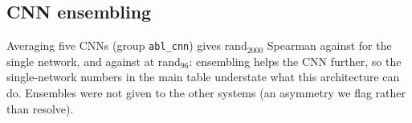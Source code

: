 \subsection{CNN ensembling}
Averaging five CNNs (group \texttt{abl\_cnn}) gives rand$_{2000}$ Spearman  against  for the single network, and  against  at rand$_{96}$: ensembling helps the CNN further, so the single-network numbers in the main table understate what this architecture can do. Ensembles were not given to the other systems (an asymmetry we flag rather than resolve).
